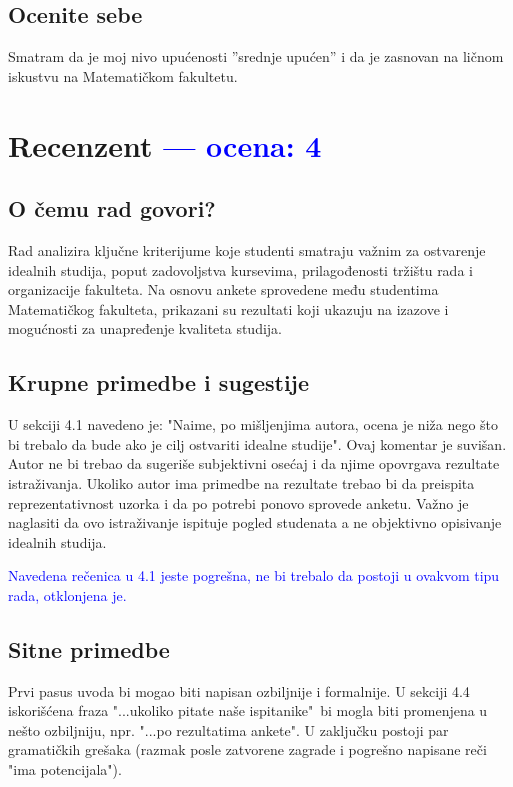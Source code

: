 \documentclass[a4paper]{report}
\newcommand{\odgovor}[1]{\textcolor{blue}{#1}}
\begin{document}
 \section{Ocenite sebe}
 Smatram da je moj nivo upućenosti ''srednje upućen'' i da je zasnovan na ličnom iskustvu na Matematičkom fakultetu.
 
 
 \chapter{Recenzent \odgovor{--- ocena: 4} }
 
 
 \section{O čemu rad govori?}
 Rad analizira ključne kriterijume koje studenti smatraju važnim za ostvarenje idealnih studija, poput zadovoljstva kursevima, prilagođenosti tržištu rada i organizacije fakulteta. Na osnovu ankete sprovedene među studentima Matematičkog fakulteta, prikazani su rezultati koji ukazuju na izazove i mogućnosti za unapređenje kvaliteta studija.
 \section{Krupne primedbe i sugestije}
 U sekciji 4.1 navedeno je: "Naime, po mišljenjima autora, ocena je niža nego što bi trebalo da bude ako je cilj ostvariti idealne studije". Ovaj komentar je suvišan. Autor ne bi trebao da sugeriše subjektivni osećaj i da njime opovrgava rezultate istraživanja. Ukoliko autor ima primedbe na rezultate trebao bi da preispita reprezentativnost uzorka i da po potrebi ponovo sprovede anketu. Važno je naglasiti da ovo istraživanje ispituje pogled studenata a ne objektivno opisivanje idealnih studija.
 
 \odgovor{Navedena rečenica u 4.1 jeste pogrešna, ne bi trebalo da postoji u ovakvom tipu rada, otklonjena je.}
 
 \section{Sitne primedbe}
 Prvi pasus uvoda bi mogao biti napisan ozbiljnije i formalnije. U sekciji 4.4 iskorišćena fraza "...ukoliko pitate naše ispitanike"\ bi mogla biti promenjena u nešto ozbiljniju, npr. "...po rezultatima ankete". U zaključku postoji par gramatičkih grešaka (razmak posle zatvorene zagrade i pogrešno napisane reči "ima potencijala").
 
\end{document}
